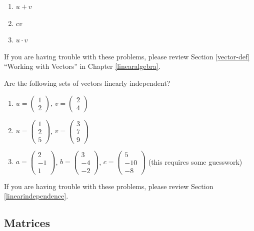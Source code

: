 \documentclass[]{book}
\providecommand{\tightlist}{%
  \setlength{\itemsep}{0pt}\setlength{\parskip}{0pt}}
\theoremstyle{definition}
\theoremstyle{definition}
\theoremstyle{definition}
\theoremstyle{remark}
\begin{document}
\begin{enumerate}
\def\labelenumi{\arabic{enumi}.}
\tightlist
\item
  \(u + v\)
\item
  \(cv\)
\item
  \(u \cdot v\)
\end{enumerate}

If you are having trouble with these problems, please review Section
\ref{vector-def} ``Working with Vectors'' in Chapter
\ref{linearalgebra}.

Are the following sets of vectors linearly independent?

\begin{enumerate}
\def\labelenumi{\arabic{enumi}.}
\item
  \(u = \begin{pmatrix} 1\\ 2\end{pmatrix}\),
  \(v = \begin{pmatrix} 2\\4\end{pmatrix}\)
\item
  \(u = \begin{pmatrix} 1\\ 2\\ 5 \end{pmatrix}\),
  \(v = \begin{pmatrix} 3\\ 7\\ 9 \end{pmatrix}\)
\item
  \(a = \begin{pmatrix} 2\\ -1\\ 1 \end{pmatrix}\),
  \(b = \begin{pmatrix} 3\\ -4\\ -2 \end{pmatrix}\),
  \(c = \begin{pmatrix} 5\\ -10\\ -8 \end{pmatrix}\) (this requires some
  guesswork)
\end{enumerate}

If you are having trouble with these problems, please review Section
\ref{linearindependence}.

\subsection*{Matrices}\label{matrices}
\end{document}
